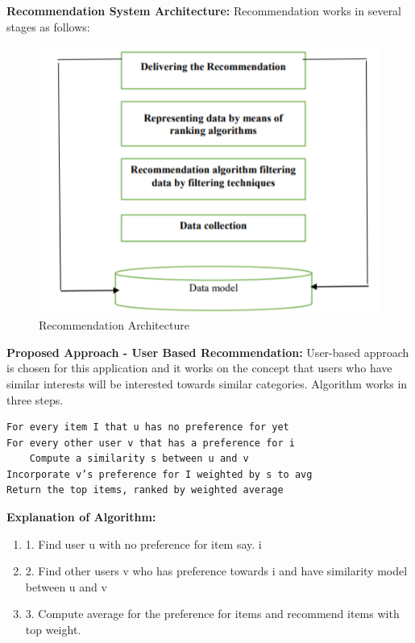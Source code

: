 \textbf{Recommendation System Architecture:}
Recommendation works in several stages as follows:
 \begin{figure}[h!]
\begin{center}
    \includegraphics[scale=1.5]{images/recommendation.PNG}
     \centering \caption{Recommendation Architecture}
\end{center}
\end{figure}

\textbf{Proposed Approach - User Based Recommendation:
}
User-based approach is chosen for this application and it works on the concept that users who have similar interests will be interested towards similar categories\cite{madhushree2016}.\newline
Algorithm works in three steps\cite{madhushree2016}.
\UseRawInputEncoding
\begin{lstlisting}
For every item I that u has no preference for yet
For every other user v that has a preference for i
    Compute a similarity s between u and v
Incorporate v’s preference for I weighted by s to avg
Return the top items, ranked by weighted average
\end{lstlisting}

\textbf{Explanation of Algorithm:}
 \begin{enumerate}
     \item 1. Find user u with no preference for item say. i
     \item 2. Find other users v who has preference towards i and have similarity model between  u and v
     \item 3. Compute average for the preference for items and recommend items with top weight.
 \end{enumerate}
 
